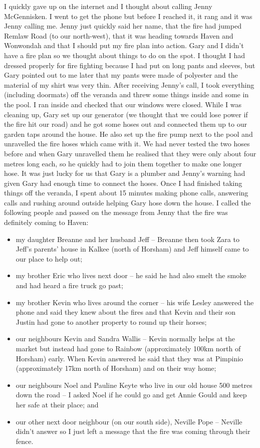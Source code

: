 \documentclass[a4paper]{article}
\begin{document}
    I quickly gave up on the internet and I thought about calling Jenny McGennisken. I went to get the phone but before I reached it, it rang and it was Jenny calling me. Jenny just quickly said her name, that the fire had jumped Remlaw Road (to our north-west), that it was heading towards Haven and Wonwondah and that I should put my fire plan into action. Gary and I didn't have a fire plan so we thought about things to do on the spot. I thought I had dressed properly for fire fighting because I had put on long pants and sleeves, but Gary pointed out to me later that my pants were made of polyester and the material of my shirt was very thin.
    After receiving Jenny's call, I took everything (including doormats) off the veranda and threw some things inside and some in the pool. I ran inside and checked that our windows were closed. While I was cleaning up, Gary set up our generator (we thought that we could lose power if the fire hit our road) and he got some hoses out and connected them up to our garden taps around the house. He also set up the fire pump next to the pool and unravelled the fire hoses which came with it. We had never tested the two hoses before and when Gary unravelled them he realised that they were only about four metres long each, so he quickly had to join them together to make one longer hose. It was just lucky for us that Gary is a plumber and Jenny's warning had given Gary had enough time to connect the hoses.
    Once I had finished taking things off the veranda, I spent about 15 minutes making phone calls, answering calls and rushing around outside helping Gary hose down the house. I called the following people and passed on the message from Jenny that the fire was definitely coming to Haven:
    \begin{itemize}
        \item my daughter Breanne and her husband Jeff – Breanne then took Zara to Jeff's parents' house in Kalkee (north of Horsham) and Jeff himself came to our place to help out;
        \item my brother Eric who lives next door – he said he had also smelt the smoke and had heard a fire truck go past;
        \item my brother Kevin who lives around the corner – his wife Lesley answered the phone and said they knew about the fires and that Kevin and their son Justin had gone to another property to round up their horses;
        \item our neighbours Kevin and Sandra Wallis – Kevin normally helps at the market but instead had gone to Rainbow (approximately 100km north of Horsham) early. When Kevin answered he said that they was at Pimpinio (approximately 17km north of Horsham) and on their way home;
        \item our neighbours Noel and Pauline Keyte who live in our old house 500 metres down the road – I asked Noel if he could go and get Annie Gould and keep her safe at their place; and
        \item our other next door neighbour (on our south side), Neville Pope – Neville didn't answer so I just left a message that the fire was coming through their fence.
    \end{itemize}
\end{document}

